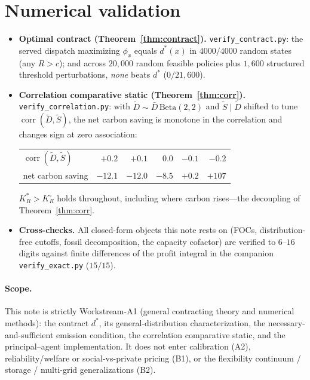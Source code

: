 \documentclass[11pt,reqno]{amsart}
\theoremstyle{plain}
\theoremstyle{definition}
\theoremstyle{remark}
\newcommand{\KRs}{K_R^{*}}\newcommand{\KFs}{K_F^{*}}\newcommand{\KMs}{K_M^{*}}
\newcommand{\KRo}{K_R^{\circ}}\newcommand{\KFo}{K_F^{\circ}}
\newcommand{\Dbar}{\bar D}
\newcommand{\dstar}{d^{*}}
\begin{document}
\section{Numerical validation}\label{sec:num}

\begin{itemize}[leftmargin=1.6em]
  \item \textbf{Optimal contract (Theorem~\ref{thm:contract}).}
        \texttt{verify\_contract.py}: the served dispatch maximizing
        $\phi_x$ equals $\dstar(x)$ in $4000/4000$ random states (any $R>c$); and
        across $20{,}000$ random feasible policies plus $1{,}600$ structured
        threshold perturbations, \emph{none} beats $\dstar$ ($0/21{,}600$).
  \item \textbf{Correlation comparative static (Theorem~\ref{thm:corr}).}
        \texttt{verify\_correlation.py}: with $\tilde D\sim\Dbar\,\mathrm{Beta}(2,2)$
        and $\tilde S\mid\tilde D$ shifted to tune $\operatorname{corr}(\tilde D,\tilde S)$,
        the net carbon saving is monotone in the correlation and changes sign at
        zero association:
        \begin{center}\small
        \begin{tabular}{lrrrrr}
        \toprule
        $\operatorname{corr}(\tilde D,\tilde S)$ & $+0.2$ & $+0.1$ & $0.0$ & $-0.1$ & $-0.2$\\
        net carbon saving & $-12.1$ & $-12.0$ & $-8.5$ & $+0.2$ & $+107$\\
        \bottomrule
        \end{tabular}
        \end{center}
        $\KRs>\KRo$ holds throughout, including where carbon rises---the
        decoupling of Theorem~\ref{thm:corr}.
  \item \textbf{Cross-checks.} All closed-form objects this note rests on
        (FOCs, distribution-free cutoffs, fossil decomposition, the capacity
        cofactor) are verified to $6$--$16$ digits against finite differences of
        the profit integral in the companion \texttt{verify\_exact.py}
        ($15/15$).
\end{itemize}

\paragraph{Scope.} This note is strictly Workstream-A1 (general contracting theory
and numerical methods): the contract $\dstar$, its general-distribution
characterization, the necessary-and-sufficient emission condition, the correlation
comparative static, and the principal--agent implementation. It does not enter
calibration (A2), reliability/welfare or social-vs-private pricing (B1), or the
flexibility continuum / storage / multi-grid generalizations (B2).
\end{document}
